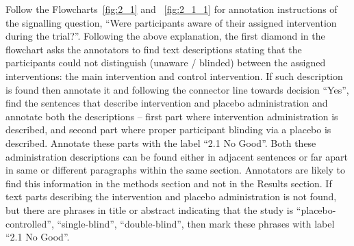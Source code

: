 \documentclass[sn-mathphys,Numbered]{sn-jnl}%
\begin{document}
Follow the Flowcharts~\ref{fig:2_1} and ~\ref{fig:2_1_1} for annotation instructions of the signalling question, ``Were participants aware of their assigned intervention during the trial?''.
Following the above explanation, the first diamond in the flowchart asks the annotators to find text descriptions stating that the participants could not distinguish (unaware / blinded) between the assigned interventions: the main intervention and control intervention.
If such description is found then annotate it and following the connector line towards decision ``Yes'', find the sentences that describe intervention and placebo administration and annotate both the descriptions – first part where intervention administration is described, and second part where proper participant blinding via a placebo is described.
Annotate these parts with the label ``2.1 No Good''.
Both these administration descriptions can be found either in adjacent sentences or far apart in same or different paragraphs within the same section.
Annotators are likely to find this information in the methods section and not in the Results section. 
If text parts describing the intervention and placebo administration is not found, but there are phrases in title or abstract indicating that the study is ``placebo-controlled'', ``single-blind'', ``double-blind'', then mark these phrases with label ``2.1 No Good''.
\end{document}
